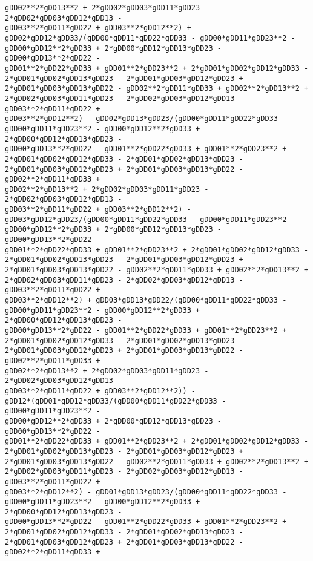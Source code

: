 \documentclass[landscape,letterpaper,10pt,english]{article}
\begin{document}
\begin{Verbatim}[commandchars=\\\{\}]
gDD02**2*gDD13**2 + 2*gDD02*gDD03*gDD11*gDD23 - 2*gDD02*gDD03*gDD12*gDD13 -
gDD03**2*gDD11*gDD22 + gDD03**2*gDD12**2) +
gDD02*gDD12*gDD33/(gDD00*gDD11*gDD22*gDD33 - gDD00*gDD11*gDD23**2 -
gDD00*gDD12**2*gDD33 + 2*gDD00*gDD12*gDD13*gDD23 - gDD00*gDD13**2*gDD22 -
gDD01**2*gDD22*gDD33 + gDD01**2*gDD23**2 + 2*gDD01*gDD02*gDD12*gDD33 -
2*gDD01*gDD02*gDD13*gDD23 - 2*gDD01*gDD03*gDD12*gDD23 +
2*gDD01*gDD03*gDD13*gDD22 - gDD02**2*gDD11*gDD33 + gDD02**2*gDD13**2 +
2*gDD02*gDD03*gDD11*gDD23 - 2*gDD02*gDD03*gDD12*gDD13 - gDD03**2*gDD11*gDD22 +
gDD03**2*gDD12**2) - gDD02*gDD13*gDD23/(gDD00*gDD11*gDD22*gDD33 -
gDD00*gDD11*gDD23**2 - gDD00*gDD12**2*gDD33 + 2*gDD00*gDD12*gDD13*gDD23 -
gDD00*gDD13**2*gDD22 - gDD01**2*gDD22*gDD33 + gDD01**2*gDD23**2 +
2*gDD01*gDD02*gDD12*gDD33 - 2*gDD01*gDD02*gDD13*gDD23 -
2*gDD01*gDD03*gDD12*gDD23 + 2*gDD01*gDD03*gDD13*gDD22 - gDD02**2*gDD11*gDD33 +
gDD02**2*gDD13**2 + 2*gDD02*gDD03*gDD11*gDD23 - 2*gDD02*gDD03*gDD12*gDD13 -
gDD03**2*gDD11*gDD22 + gDD03**2*gDD12**2) -
gDD03*gDD12*gDD23/(gDD00*gDD11*gDD22*gDD33 - gDD00*gDD11*gDD23**2 -
gDD00*gDD12**2*gDD33 + 2*gDD00*gDD12*gDD13*gDD23 - gDD00*gDD13**2*gDD22 -
gDD01**2*gDD22*gDD33 + gDD01**2*gDD23**2 + 2*gDD01*gDD02*gDD12*gDD33 -
2*gDD01*gDD02*gDD13*gDD23 - 2*gDD01*gDD03*gDD12*gDD23 +
2*gDD01*gDD03*gDD13*gDD22 - gDD02**2*gDD11*gDD33 + gDD02**2*gDD13**2 +
2*gDD02*gDD03*gDD11*gDD23 - 2*gDD02*gDD03*gDD12*gDD13 - gDD03**2*gDD11*gDD22 +
gDD03**2*gDD12**2) + gDD03*gDD13*gDD22/(gDD00*gDD11*gDD22*gDD33 -
gDD00*gDD11*gDD23**2 - gDD00*gDD12**2*gDD33 + 2*gDD00*gDD12*gDD13*gDD23 -
gDD00*gDD13**2*gDD22 - gDD01**2*gDD22*gDD33 + gDD01**2*gDD23**2 +
2*gDD01*gDD02*gDD12*gDD33 - 2*gDD01*gDD02*gDD13*gDD23 -
2*gDD01*gDD03*gDD12*gDD23 + 2*gDD01*gDD03*gDD13*gDD22 - gDD02**2*gDD11*gDD33 +
gDD02**2*gDD13**2 + 2*gDD02*gDD03*gDD11*gDD23 - 2*gDD02*gDD03*gDD12*gDD13 -
gDD03**2*gDD11*gDD22 + gDD03**2*gDD12**2)) -
gDD12*(gDD01*gDD12*gDD33/(gDD00*gDD11*gDD22*gDD33 - gDD00*gDD11*gDD23**2 -
gDD00*gDD12**2*gDD33 + 2*gDD00*gDD12*gDD13*gDD23 - gDD00*gDD13**2*gDD22 -
gDD01**2*gDD22*gDD33 + gDD01**2*gDD23**2 + 2*gDD01*gDD02*gDD12*gDD33 -
2*gDD01*gDD02*gDD13*gDD23 - 2*gDD01*gDD03*gDD12*gDD23 +
2*gDD01*gDD03*gDD13*gDD22 - gDD02**2*gDD11*gDD33 + gDD02**2*gDD13**2 +
2*gDD02*gDD03*gDD11*gDD23 - 2*gDD02*gDD03*gDD12*gDD13 - gDD03**2*gDD11*gDD22 +
gDD03**2*gDD12**2) - gDD01*gDD13*gDD23/(gDD00*gDD11*gDD22*gDD33 -
gDD00*gDD11*gDD23**2 - gDD00*gDD12**2*gDD33 + 2*gDD00*gDD12*gDD13*gDD23 -
gDD00*gDD13**2*gDD22 - gDD01**2*gDD22*gDD33 + gDD01**2*gDD23**2 +
2*gDD01*gDD02*gDD12*gDD33 - 2*gDD01*gDD02*gDD13*gDD23 -
2*gDD01*gDD03*gDD12*gDD23 + 2*gDD01*gDD03*gDD13*gDD22 - gDD02**2*gDD11*gDD33 +

\end{Verbatim}
\end{document}
